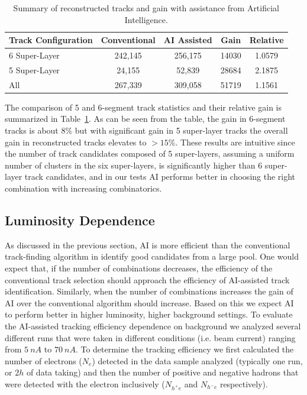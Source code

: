  \begin{table}[!h]
 \begin{center}
 \begin{tabular}{|l|c|c|c|c|}
 \hline
 Track Configuration & Conventional & AI Assisted & Gain & Relative \\
 \hline
 \hline
 6 Super-Layer & 242,145 & 256,175 & 14030 & 1.0579 \\
 5 Super-Layer & 24,155 & 52,839 & 28684 & 2.1875 \\
 All & 267,339 & 309,058 & 51719 & 1.1561 \\
 \hline
 \end{tabular}
 \end{center}
 \caption{Summary of reconstructed tracks and gain with assistance from Artificial Intelligence.}
 \label{tbl:summary}
 \end{table}
 
The comparison of 5 and 6-segment track statistics and their relative gain is summarized in Table~\ref{tbl:summary}.
As can be seen from the table, the gain in 6-segment tracks is about $8\%$ but with significant gain in 5 super-layer tracks 
the overall gain in reconstructed tracks elevates to $>15\%$. These results are intuitive since the number of track candidates composed of 5
super-layers, assuming a uniform number of clusters in the six super-layers, is significantly higher than 6 super-layer track candidates, and 
in our tests AI performs better in choosing the right combination with increasing combinatorics.
 
\subsection{Luminosity Dependence}
As discussed in the previous section, AI is more efficient than the conventional track-finding algorithm in identify good candidates from a large pool.
One would expect that, if the number of combinations decreases, the efficiency of the conventional track selection should approach the efficiency of 
AI-assisted track identification. Similarly, when the number of combinations increases the gain of AI over the conventional algorithm should
increase. Based on this we expect AI to perform better in higher luminosity, higher background settings. To evaluate the AI-assisted tracking efficiency 
dependence on background we analyzed several different runs that were taken in different conditions (i.e. beam current) ranging from $5~nA$ to 
$70~nA$. To determine the tracking efficiency we first calculated the number of electrons ($N_e$) detected in the data sample analyzed (typically one run,
or $2h$ of data taking) and then the number of positive and negative hadrons that were detected with the electron inclusively ($N_{h^+e}$ and $N_{h^-e}$ respectively).

